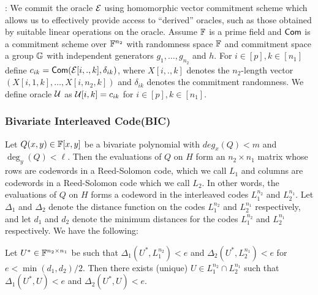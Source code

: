 : We commit the oracle $\mathcal{E}$ using
homomorphic vector commitment scheme which allows us to effectively provide
access to ``derived'' oracles, such as those obtained by suitable linear
operations on the oracle. Assume $\mathbb{F}$ is a prime field and $\mathsf{Com}$ is a
commitment scheme over $\mathbb{F}^{n_2}$ with randomness space $\mathbb{F}$ and commitment
space a group $\mathbb{G}$ with independent generators $g_1,\ldots,g_{n_2}$ and $h$.
For $i\in [p], k\in [n_1]$ define $c_{ik}=\mathsf{Com}(\mathcal{E}[i,.,k],\delta_{ik})$,
where $X[i,.,k]$ denotes the $n_2$-length vector $(X[i,1,k],\ldots,X[i,n_2,k])$
and $\delta_{ik}$ denotes the commitment randomness. We define oracle
$\mathcal{U}$ as $\mathcal{U}[i,k]=c_{ik}$ for $i\in [p],k\in [n_1]$.

\subsubsection{Bivariate Interleaved Code(BIC)}
Let $Q(x,y)\in \mathbb{F}[x,y]$ be a bivariate polynomial with $deg_x(Q) < m$ and
$\deg_y(Q) < \ell$. Then the evaluations of $Q$ on $H$ form an $n_2\times n_1$
matrix whose rows are codewords in a Reed-Solomon code, which we call $L_1$ and columns
are codewords in a Reed-Solomon code which we call $L_2$. In other words, the
evaluations of $Q$ on $H$ forms a codeword in the interleaved codes $L_1^{n_2}$
and $L_2^{n_1}$. Let $\Delta_1$ and $\Delta_2$ denote the distance function on
the codes $L_1^{n_2}$ and $L_2^{n_1}$ respectively, and let $d_1$ and $d_2$
denote the minimum distances for the codes $L_1^{n_2}$ and $L_2^{n_1}$
respectively. We have the following:
\begin{lemma}\label{lem:bicdecoding}
Let $U^\ast\in \mathbb{F}^{n_2\times n_1}$ be such that $\Delta_1(U^\ast,L_1^{n_2})<e$
and $\Delta_2(U^\ast,L_2^{n_1})<e$ for $e < \min(d_1,d_2)/2$. Then there exists
(unique) 
$U\in L_1^{n_2}\cap L_2^{n_1}$ such that $\Delta_1(U^\ast,U)<e$ and
$\Delta_2(U^\ast,U)<e$.
\end{lemma}
